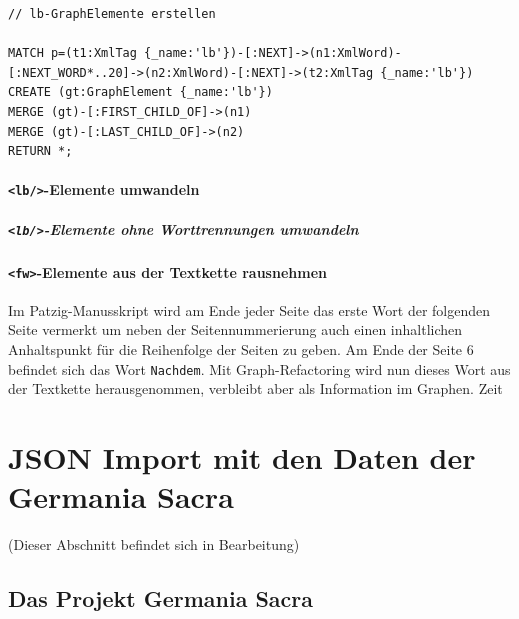 \documentclass[ngerman,]{scrreprt}
\let\oldparagraph\paragraph
\renewcommand{\paragraph}[1]{\oldparagraph{#1}\mbox{}}
\begin{document}
\begin{verbatim}
// lb-GraphElemente erstellen

MATCH p=(t1:XmlTag {_name:'lb'})-[:NEXT]->(n1:XmlWord)-[:NEXT_WORD*..20]->(n2:XmlWord)-[:NEXT]->(t2:XmlTag {_name:'lb'})
CREATE (gt:GraphElement {_name:'lb'})
MERGE (gt)-[:FIRST_CHILD_OF]->(n1)
MERGE (gt)-[:LAST_CHILD_OF]->(n2)
RETURN *;
\end{verbatim}

\subsubsection{\texorpdfstring{\texttt{\textless{}lb/\textgreater{}}-Elemente umwandeln}{\textless{}lb/\textgreater{}-Elemente umwandeln}}\label{lb-elemente-umwandeln}

\paragraph{\texorpdfstring{\texttt{\textless{}lb/\textgreater{}}-Elemente ohne Worttrennungen umwandeln}{\textless{}lb/\textgreater{}-Elemente ohne Worttrennungen umwandeln}}\label{lb-elemente-ohne-worttrennungen-umwandeln}

\subsubsection{\texorpdfstring{\texttt{\textless{}fw\textgreater{}}-Elemente aus der Textkette rausnehmen}{\textless{}fw\textgreater{}-Elemente aus der Textkette rausnehmen}}\label{fw-elemente-aus-der-textkette-rausnehmen}

Im Patzig-Manusskript wird am Ende jeder Seite das erste Wort der folgenden Seite vermerkt um neben der Seitennummerierung auch einen inhaltlichen Anhaltspunkt für die Reihenfolge der Seiten zu geben. Am Ende der Seite 6 befindet sich das Wort \texttt{Nachdem}. Mit Graph-Refactoring wird nun dieses Wort aus der Textkette herausgenommen, verbleibt aber als Information im Graphen. Zeit

\chapter{JSON Import mit den Daten der Germania Sacra}\label{json-import-mit-den-daten-der-germania-sacra}

(Dieser Abschnitt befindet sich in Bearbeitung)

\section{Das Projekt Germania Sacra}\label{das-projekt-germania-sacra}
\end{document}
